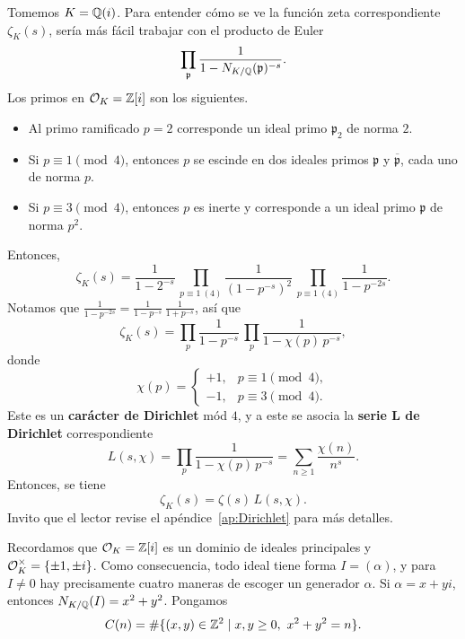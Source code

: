Tomemos $K = \mathbb{Q} (i)$. Para entender cómo se ve la función zeta correspondiente
$\zeta_K (s)$, sería más fácil trabajar con el producto de Euler
$$\prod_{\mathfrak{p}} \frac{1}{1 - N_{K/\mathbb{Q}} (\mathfrak{p})^{-s}}.$$
Los primos en $\mathcal{O}_K = \mathbb{Z}[i]$ son los siguientes.
\begin{itemize}
\item Al primo ramificado $p = 2$ corresponde un ideal primo $\mathfrak{p}_2$
  de norma $2$.

\item Si $p \equiv 1 \pmod{4}$, entonces $p$ se escinde en dos ideales primos
  $\mathfrak{p}$ y $\overline{\mathfrak{p}}$, cada uno de norma $p$.

\item Si $p \equiv 3 \pmod{4}$, entonces $p$ es inerte y corresponde a un ideal
  primo $\mathfrak{p}$ de norma $p^2$.
\end{itemize}

Entonces,
\[ \zeta_K (s) =
   \frac{1}{1 - 2^{-s}} \,
   \prod_{p \equiv 1 ~ (4)} \frac{1}{(1 - p^{-s})^2} \,
   \prod_{p \equiv 1 ~ (4)} \frac{1}{1 - p^{-2s}}. \]
Notamos que $\frac{1}{1 - p^{-2s}} = \frac{1}{1 - p^{-s}}\,\frac{1}{1 + p^{-s}}$,
así que
$$\zeta_K (s) = \prod_p \frac{1}{1 - p^{-s}}\,\prod_p \frac{1}{1 - \chi(p)\,p^{-s}},$$
donde
\[ \chi(p) = \begin{cases}
  +1, & p \equiv 1 \pmod{4},\\
  -1, & p \equiv 3 \pmod{4}.
\end{cases} \]
Este es un \textbf{carácter de Dirichlet} mód $4$, y a este se asocia la
\textbf{serie L de Dirichlet} correspondiente
\[ L (s,\chi) = \prod_p \frac{1}{1 - \chi(p)\,p^{-s}} =
   \sum_{n\ge 1} \frac{\chi (n)}{n^s}. \]
Entonces, se tiene
$$\zeta_K (s) = \zeta (s) \, L (s,\chi).$$
Invito que el lector revise el apéndice~\ref{ap:Dirichlet} para más detalles.

Recordamos que $\mathcal{O}_K = \mathbb{Z} [i]$ es un dominio de ideales principales y
$\mathcal{O}_K^\times = \{ \pm 1, \pm i \}$. Como consecuencia, todo ideal tiene forma
$I = (\alpha)$, y para $I \ne 0$ hay precisamente cuatro maneras de escoger un
generador $\alpha$. Si $\alpha = x + yi$, entonces $N_{K/\mathbb{Q}} (I) = x^2 + y^2$.
Pongamos
$$C (n) = \# \{ (x,y) \in \mathbb{Z}^2 \mid x,y \ge 0, ~ x^2 + y^2 = n \}.$$

